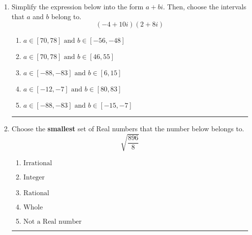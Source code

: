 \documentclass[14pt]{extbook}
\newcommand{\litem}[1]{\item#1\hspace*{-1cm}\rule{\textwidth}{0.4pt}}
\begin{document}
\begin{enumerate}
{\begin{enumerate}[label=\Alph*.]
\end{enumerate} }
\litem{
Simplify the expression below into the form $a+bi$. Then, choose the intervals that $a$ and $b$ belong to.\[ (-4 + 10 i)(2 + 8 i) \]\begin{enumerate}[label=\Alph*.]
\item \( a \in [70, 78] \text{ and } b \in [-56, -48] \)
\item \( a \in [70, 78] \text{ and } b \in [46, 55] \)
\item \( a \in [-88, -83] \text{ and } b \in [6, 15] \)
\item \( a \in [-12, -7] \text{ and } b \in [80, 83] \)
\item \( a \in [-88, -83] \text{ and } b \in [-15, -7] \)

\end{enumerate} }
\litem{
Choose the \textbf{smallest} set of Real numbers that the number below belongs to.\[ \sqrt{\frac{896}{8}} \]\begin{enumerate}[label=\Alph*.]
\item \( \text{Irrational} \)
\item \( \text{Integer} \)
\item \( \text{Rational} \)
\item \( \text{Whole} \)
\item \( \text{Not a Real number} \)

\end{enumerate} }
\end{enumerate}
\end{document}
